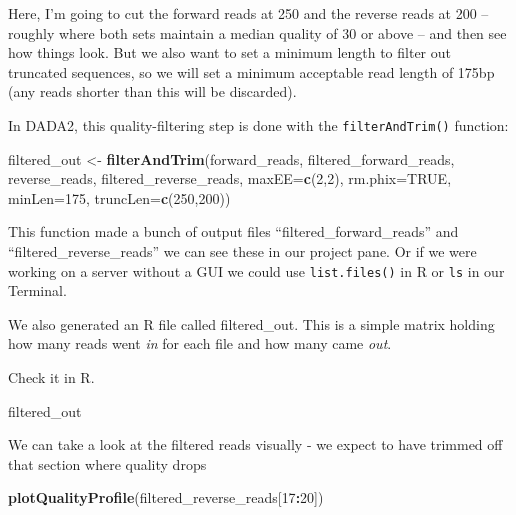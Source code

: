 \documentclass[
]{book}
\newenvironment{Shaded}{\begin{snugshade}}{\end{snugshade}}
\newcommand{\AttributeTok}[1]{\textcolor[rgb]{0.13,0.29,0.53}{#1}}
\newcommand{\ConstantTok}[1]{\textcolor[rgb]{0.56,0.35,0.01}{#1}}
\newcommand{\DecValTok}[1]{\textcolor[rgb]{0.00,0.00,0.81}{#1}}
\newcommand{\FunctionTok}[1]{\textcolor[rgb]{0.13,0.29,0.53}{\textbf{#1}}}
\newcommand{\NormalTok}[1]{#1}
\newcommand{\OtherTok}[1]{\textcolor[rgb]{0.56,0.35,0.01}{#1}}
\newcommand{\SpecialCharTok}[1]{\textcolor[rgb]{0.81,0.36,0.00}{\textbf{#1}}}
\begin{document}
Here, I'm going to cut the forward reads at 250 and the reverse reads at 200 -- roughly where both sets maintain a median quality of 30 or above -- and then see how things look. But we also want to set a minimum length to filter out truncated sequences, so we will set a minimum acceptable read length of 175bp (any reads shorter than this will be discarded).

In DADA2, this quality-filtering step is done with the \texttt{filterAndTrim()} function:

\begin{Shaded}
\begin{Highlighting}[]
\NormalTok{    filtered\_out }\OtherTok{\textless{}{-}} \FunctionTok{filterAndTrim}\NormalTok{(forward\_reads, filtered\_forward\_reads,}
\NormalTok{                    reverse\_reads, filtered\_reverse\_reads, }\AttributeTok{maxEE=}\FunctionTok{c}\NormalTok{(}\DecValTok{2}\NormalTok{,}\DecValTok{2}\NormalTok{),}
                    \AttributeTok{rm.phix=}\ConstantTok{TRUE}\NormalTok{, }\AttributeTok{minLen=}\DecValTok{175}\NormalTok{, }\AttributeTok{truncLen=}\FunctionTok{c}\NormalTok{(}\DecValTok{250}\NormalTok{,}\DecValTok{200}\NormalTok{))}
\end{Highlighting}
\end{Shaded}

This function made a bunch of output files ``filtered\_forward\_reads'' and ``filtered\_reverse\_reads'' we can see these in our project pane. Or if we were working on a server without a GUI we could use \texttt{list.files()} in R or \texttt{ls} in our Terminal.

We also generated an R file called filtered\_out. This is a simple matrix holding how many reads went \emph{in} for each file and how many came \emph{out}.

Check it in R.

\begin{Shaded}
\begin{Highlighting}[]
\NormalTok{    filtered\_out}
\end{Highlighting}
\end{Shaded}

We can take a look at the filtered reads visually - we expect to have trimmed off that section where quality drops

\begin{Shaded}
\begin{Highlighting}[]
    \FunctionTok{plotQualityProfile}\NormalTok{(filtered\_reverse\_reads[}\DecValTok{17}\SpecialCharTok{:}\DecValTok{20}\NormalTok{])}
\end{Highlighting}
\end{Shaded}
\end{document}

